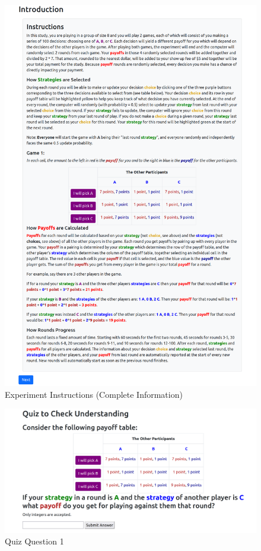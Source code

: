 \begin{figure}[h]
\captionsetup{justification=centering}
  \caption[caption]{Experiment Instructions (Complete Information)}
   \label{fig:Instructions}
    \includegraphics[width = .9\textwidth]{Images/Instructions.png}
\end{figure}

\begin{figure}[h]
\captionsetup{justification=centering}
  \caption[caption]{Quiz Question 1}
   \label{fig:QuizQ1}
    \includegraphics[width = \textwidth]{Images/Q1.png}
\end{figure}

